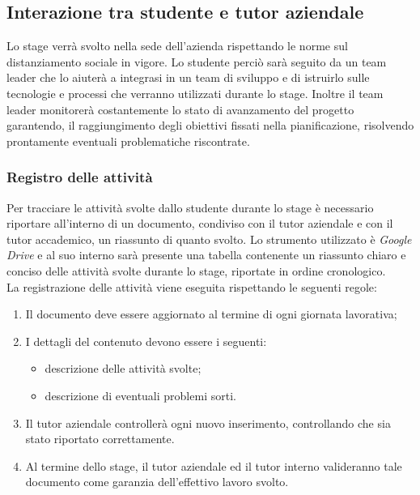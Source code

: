 \subsection{Interazione tra studente e tutor aziendale}

Lo stage verrà svolto nella sede dell'azienda rispettando le norme sul distanziamento sociale in vigore. Lo studente perciò sarà seguito da un team leader che lo aiuterà a integrasi in un team di sviluppo e di istruirlo sulle tecnologie e processi che verranno utilizzati durante lo stage. Inoltre il team leader monitorerà costantemente lo stato di avanzamento del progetto garantendo, il raggiungimento degli obiettivi fissati nella pianificazione, risolvendo prontamente eventuali problematiche riscontrate.

\subsubsection{Registro delle attività}
Per tracciare le attività svolte dallo studente durante lo stage è necessario riportare all'interno di un documento, condiviso con il tutor aziendale e con il tutor accademico, un riassunto di quanto svolto.
Lo strumento utilizzato è \textit{Google Drive} e al suo interno sarà presente una tabella contenente un riassunto chiaro e conciso delle attività svolte durante lo stage, riportate in ordine cronologico. \\
La registrazione delle attività viene eseguita rispettando le seguenti regole:
\begin{enumerate}
	\item Il documento deve essere aggiornato al termine di ogni giornata lavorativa;
	\item I dettagli del contenuto devono essere i seguenti:
		\begin{itemize}
			\item descrizione delle attività svolte;
			\item descrizione di eventuali problemi sorti.
		\end{itemize}
	\item Il tutor aziendale controllerà ogni nuovo inserimento, controllando che sia stato riportato correttamente. 
	\item Al termine dello stage, il tutor aziendale ed il tutor interno valideranno tale documento come garanzia dell'effettivo lavoro svolto.
\end{enumerate}

\pagebreak